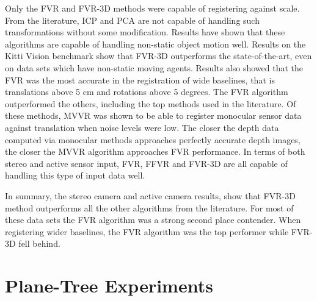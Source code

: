 Only the FVR and FVR-3D methods were capable of registering against scale. From the literature, ICP and PCA are not capable of handling such transformations without some modification. Results have shown that these algorithms are capable of handling non-static object motion well. Results on the Kitti Vision benchmark show that FVR-3D outperforms the state-of-the-art, even on data sets which have non-static moving agents. Results also showed that the FVR was the most accurate in the registration of wide baselines, that is translations above 5 cm and rotations above 5 degrees. The FVR algorithm outperformed the others, including the top methods used in the literature. Of these methods, MVVR was shown to be able to register monocular sensor data against translation when noise levels were low. The closer the depth data computed via monocular methods approaches perfectly accurate depth images, the closer the MVVR algorithm approaches FVR performance. In terms of both stereo and active sensor input, FVR, FFVR and FVR-3D are all capable of handling this type of input data well. \\


\begin{table}[h]
\caption{FVR Comparison Table \label{tab:GridRT}}
\end{table}


In summary, the stereo camera and active camera results, show that FVR-3D method outperforms all the other algorithms from the literature. For most of these data sets the FVR algorithm was a strong second place contender. When registering wider baselines, the FVR algorithm was the top performer while FVR-3D fell behind.

\section{Plane-Tree Experiments}

